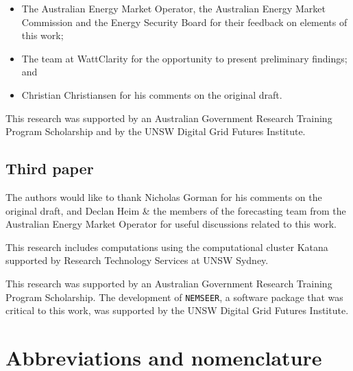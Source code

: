 \documentclass[12pt,a4paper,]{report}
\providecommand{\tightlist}{%
  \setlength{\itemsep}{0pt}\setlength{\parskip}{0pt}}
\begin{document}
\begin{itemize}
\tightlist
\item
  The Australian Energy Market Operator, the Australian Energy Market
  Commission and the Energy Security Board for their feedback on
  elements of this work;
\item
  The team at WattClarity for the opportunity to present preliminary
  findings; and
\item
  Christian Christiansen for his comments on the original draft.
\end{itemize}

This research was supported by an Australian Government Research
Training Program Scholarship and by the UNSW Digital Grid Futures
Institute.

\hypertarget{third-paper}{%
\section*{Third paper}\label{third-paper}}

The authors would like to thank Nicholas Gorman for his comments on the
original draft, and Declan Heim \& the members of the forecasting team
from the Australian Energy Market Operator for useful discussions
related to this work.

This research includes computations using the computational cluster
Katana supported by Research Technology Services at UNSW Sydney.

This research was supported by an Australian Government Research
Training Program Scholarship. The development of \texttt{NEMSEER}, a
software package that was critical to this work, was supported by the
UNSW Digital Grid Futures Institute. \newpage


\tableofcontents

\newpage

\listoffigures

\newpage

\listoftables

\newpage

\hypertarget{abbreviations-and-nomenclature}{%
\chapter*{Abbreviations and
nomenclature}\label{abbreviations-and-nomenclature}}
\end{document}

